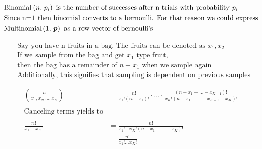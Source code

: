 \documentclass[12pt]{article}
\begin{document}
\begin{enumerate}



\begin{align*}
   &\mathrm{Binomial}\left(n,\,p_i\right) \text{ is the number of successes after n trials with probability } p_i \\
   &\text{Since n=1 then binomial converts to a bernoulli. For that reason we could express} \\
   &\mathrm{Multinomial}\left(1,\,\boldsymbol{p}\right) \text{ as a row vector of bernoulli's}
\end{align*}


\begin{align*}
    &\text{Say you have n fruits in a bag. The fruits can be denoted as } x_1, x_2 \\
    &\text{If we sample from the bag and get $x_1$ type fruit, } \\ 
    &\text{then the bag has a remainder of $n-x_1$ when we sample again} \\
    &\text{Additionally, this signifies that sampling is dependent on previous samples}  
\end{align*}


\begin{align*}
    \binom{n}{x_1, x_2, \ldots, x_K} &= \frac{n!}{x_1!(n-x_1)!} \cdot \ldots \cdot \frac{(n-x_1-\ldots-x_{K-1})!}{x_K!(n-x_1-\ldots-x_{K-1}-x_K)!} \\
    \\
    \text{Canceling terms yields to} \\ \\ 
    \frac{n!}{x_1!\ldots x_K!} &= \frac{n!}{x_1!\ldots x_K! (n-x_1-\ldots-x_K)!} \\
    &= \frac{n!}{x_1!\ldots x_K!}
\end{align*}

\end{enumerate}
\end{document}
